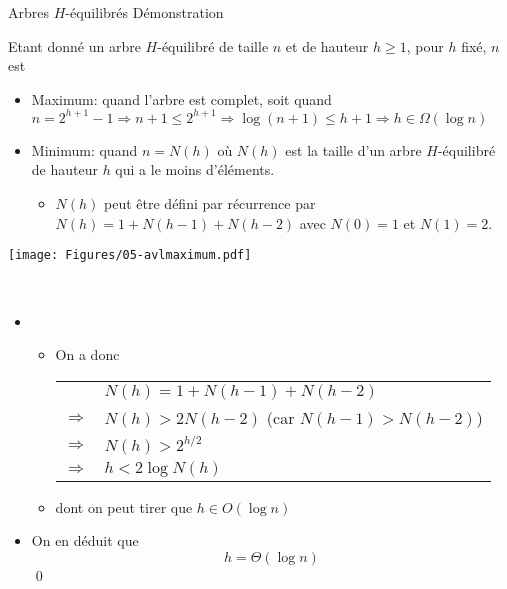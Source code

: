 \begin{frame}{Arbres $H$-équilibrés}
\alert{Démonstration}

Etant donné un arbre $H$-équilibré de taille $n$ et de hauteur $h\geq 1$, pour $h$ fixé, $n$ est
\begin{itemize}
\item Maximum: quand l'arbre est complet, soit quand
$n=2^{h+1}-1\Rightarrow n+1\leq 2^{h+1} \Rightarrow \log (n+1)\leq h+1 \Rightarrow h\in\Omega(\log n) $
\item Minimum: quand $n=N(h)$ où $N(h)$ est la taille d'un arbre $H$-équilibré de hauteur $h$ qui a le moins d'éléments.
\begin{itemize}
\item $N(h)$ peut être défini par récurrence par $N(h)=1+N(h-1)+N(h-2)$ avec $N(0)=1$ et $N(1)=2$.
\end{itemize}
\end{itemize}
\centerline{\texttt{[image: Figures/05-avlmaximum.pdf]}}


\end{frame}

\begin{frame}{~}%
\begin{itemize}
\item[]
\begin{itemize}
\item On a donc\\
\begin{tabular}{cl}
& $N(h)=1+N(h-1)+N(h-2)$\\
$\Rightarrow$ & $N(h)>2 N(h-2)$ (car $N(h-1)>N(h-2)$)\\
$\Rightarrow$ & $N(h)>2^{h/2}$\\
$\Rightarrow$ & $h< 2\log N(h)$\\
\end{tabular}
\item dont on peut tirer que
$h\in O(\log n)$
\end{itemize}
\item On en déduit que
$$h=\Theta(\log n)$$\qed
\end{itemize}

\end{frame}

